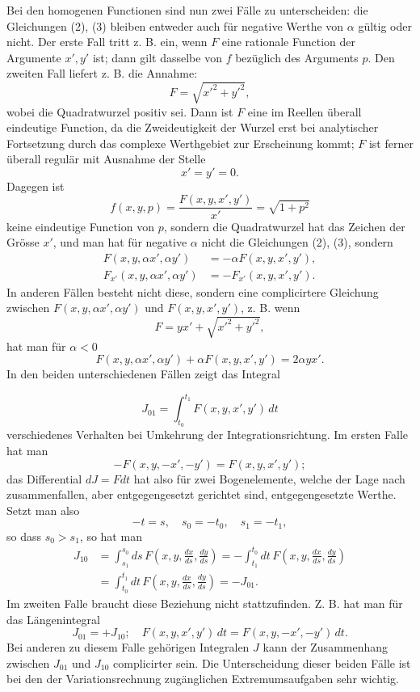 \documentclass[11pt,a4paper,leqno]{article}
\begin{document}
Bei den homogenen Functionen sind nun zwei Fälle zu unterscheiden: die Gleichungen (2), (3) bleiben entweder auch für negative Werthe von $\alpha$ gültig oder nicht. Der erste Fall tritt z. B. ein, wenn $F$ eine rationale Function der Argumente $x',y'$ ist; dann gilt dasselbe von $f$ bezüglich des Arguments $p$. Den zweiten Fall liefert z. B. die Annahme:
\[
 F=\sqrt{x'^2+y'^2},
\]
wobei die Quadratwurzel positiv sei. Dann ist $F$ eine im Reellen überall eindeutige Function, da die Zweideutigkeit der Wurzel erst bei analytischer Fortsetzung durch das complexe Werthgebiet zur Erscheinung kommt; $F$ ist ferner überall regulär mit Ausnahme der Stelle
\[
 x'=y'=0.
\]
Dagegen ist
\[
 f(x,y,p)=\frac{F(x,y,x',y')}{x'}=\sqrt{1+p^2}
\]
keine eindeutige Function von $p$, sondern die Quadratwurzel hat das Zeichen der Grösse $x'$, und man hat für negative $\alpha$ nicht die Gleichungen (2), (3), sondern
\[
\begin{aligned}
 F(x,y,\alpha x',\alpha y')&=-\alpha F(x,y,x',y'),\\
 F_{x'}(x,y,\alpha x',\alpha y')&=-F_{x'}(x,y,x',y').
\end{aligned}
\]
In anderen Fällen besteht nicht diese, sondern eine complicirtere Gleichung zwischen $F(x,y,\alpha x',\alpha y')$ und $F(x,y,x',y')$, z. B. wenn
\[
 F=yx'+\sqrt{x'^2+y'^2},
\]
hat man für $\alpha<0$
\[
 F(x,y,\alpha x',\alpha y')+\alpha F(x,y,x',y')=2\alpha yx'.
\]
In den beiden unterschiedenen Fällen zeigt das Integral

\[
 J_{01}=\int_{t_0}^{t_1}F(x,y,x',y')\,dt
\]
verschiedenes Verhalten bei Umkehrung der Integrationsrichtung. Im ersten Falle hat man
\[
 -F(x,y,-x',-y')=F(x,y,x',y');
\]
das Differential $dJ=Fdt$ hat also für zwei Bogenelemente, welche der Lage nach zusammenfallen, aber entgegengesetzt gerichtet sind, entgegengesetzte Werthe. Setzt man also
\[
 -t=s,\quad s_0=-t_0,\quad s_1=-t_1,
\]
so dass $s_0>s_1$, so hat man
\[
\begin{aligned}
 J_{10}
 &=\int_{s_1}^{s_0}ds\,F\left(x,y,\frac{dx}{ds},\frac{dy}{ds}\right)
 =-\int_{t_1}^{t_0}dt\,F\left(x,y,\frac{dx}{ds},\frac{dy}{ds}\right)\\
 &=\int_{t_0}^{t_1}dt\,F\left(x,y,\frac{dx}{ds},\frac{dy}{ds}\right)=-J_{01}.
\end{aligned}
\]
Im zweiten Falle braucht diese Beziehung nicht stattzufinden. Z. B. hat man für das Längenintegral
\[
 J_{01}=+J_{10};\quad F(x,y,x',y')\,dt=F(x,y,-x',-y')\,dt.
\]
Bei anderen zu diesem Falle gehörigen Integralen $J$ kann der Zusammenhang zwischen $J_{01}$ und $J_{10}$ complicirter sein. Die Unterscheidung dieser beiden Fälle ist bei den der Variationsrechnung zugänglichen Extremumsaufgaben sehr wichtig.
\end{document}
